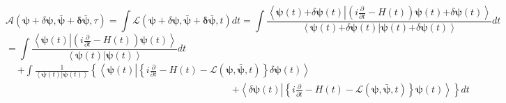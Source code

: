 \documentclass[aps,preprint]{revtex4}%
\begin{document}
\begin{equation}
\mathcal{A}\left(  \mathbf{\psi+}\delta\mathbf{\psi},\mathbf{\bar{\psi}%
+\delta\bar{\psi},}\tau\right)  =\int\mathcal{L}\left(  \mathbf{\psi+}%
\delta\mathbf{\psi},\mathbf{\bar{\psi}+\delta\bar{\psi},}t\right)
dt=\int\frac{\left\langle \mathbf{\psi}\left(  t\right)  \mathbf{+}%
\delta\mathbf{\psi}\left(  t\right)  \left\vert \left(  i\frac{\partial
}{\partial t}-H\left(  t\right)  \right)  \mathbf{\psi}\left(  t\right)
\mathbf{+}\delta\mathbf{\psi}\left(  t\right)  \right.  \right\rangle
}{\left\langle \mathbf{\psi}\left(  t\right)  \mathbf{+}\delta\mathbf{\psi
}\left(  t\right)  \left\vert \mathbf{\psi}\left(  t\right)  \mathbf{+}%
\delta\mathbf{\psi}\left(  t\right)  \right.  \right\rangle }dt
\end{equation}%
\begin{equation}
=\int\frac{\left\langle \mathbf{\psi}\left(  t\right)  \left\vert \left(
i\frac{\partial}{\partial t}-H\left(  t\right)  \right)  \mathbf{\psi}\left(
t\right)  \right.  \right\rangle }{\left\langle \mathbf{\psi}\left(  t\right)
\left\vert \mathbf{\psi}\left(  t\right)  \right.  \right\rangle }%
dt\qquad\qquad\qquad\qquad\qquad\qquad\qquad\qquad\qquad\qquad\qquad
\qquad\qquad\qquad
\end{equation}%
\begin{align}
&  +\int\frac{1}{\left\langle \mathbf{\psi}\left(  t\right)  \left\vert
\mathbf{\psi}\left(  t\right)  \right.  \right\rangle }\left\{  \left\langle
\mathbf{\psi}\left(  t\right)  \left\vert \left\{  i\frac{\partial}{\partial
t}-H\left(  t\right)  -\mathcal{L}\left(  \mathbf{\psi},\mathbf{\bar{\psi}%
,}t\right)  \right\}  \delta\mathbf{\psi}\left(  t\right)  \right.
\right\rangle \right.  \nonumber\\
&  \qquad\qquad\qquad\qquad\qquad\qquad\qquad\qquad\qquad\qquad\qquad
\mathbf{+}\left.  \left\langle \delta\mathbf{\psi}\left(  t\right)  \left\vert
\left\{  i\frac{\partial}{\partial t}-H\left(  t\right)  -\mathcal{L}\left(
\mathbf{\psi},\mathbf{\bar{\psi},}t\right)  \right\}  \right.  \mathbf{\psi
}\left(  t\right)  \right\rangle \right\}  dt
\end{align}%
\end{document}
